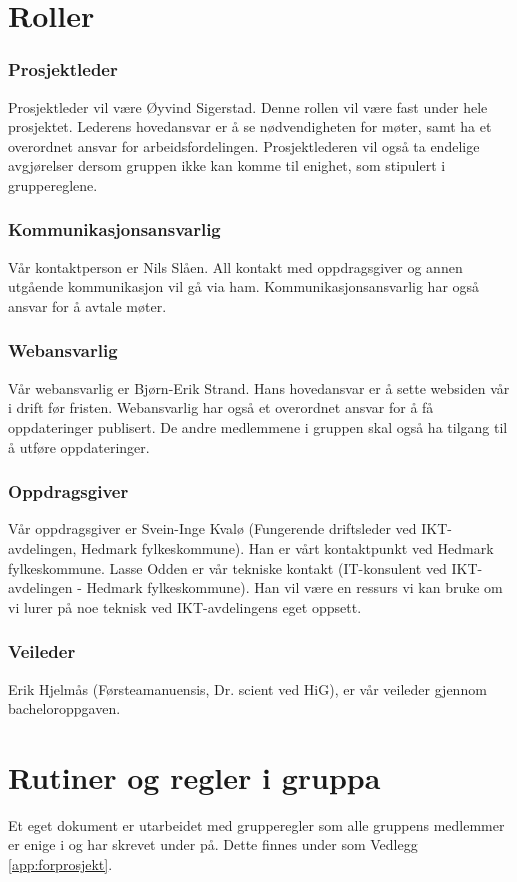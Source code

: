 \section{Roller}
\subsubsection{Prosjektleder}
Prosjektleder vil være Øyvind Sigerstad. Denne rollen vil være fast under hele prosjektet. Lederens hovedansvar er å se nødvendigheten for møter, samt ha et overordnet ansvar for arbeidsfordelingen. Prosjektlederen vil også ta endelige avgjørelser dersom gruppen ikke kan komme til enighet, som stipulert i gruppereglene.

\subsubsection{Kommunikasjonsansvarlig}
Vår kontaktperson er Nils Slåen. All kontakt med oppdragsgiver og annen utgående kommunikasjon vil gå via ham. Kommunikasjonsansvarlig har også ansvar for å avtale møter.

\subsubsection{Webansvarlig}
Vår webansvarlig er Bjørn-Erik Strand. Hans hovedansvar er å sette websiden vår i drift før fristen. Webansvarlig har også et overordnet ansvar for å få oppdateringer publisert. De andre medlemmene i gruppen skal også ha tilgang til å utføre oppdateringer.

\subsubsection{Oppdragsgiver}
Vår oppdragsgiver er Svein-Inge Kvalø (Fungerende driftsleder ved IKT-avdelingen, Hedmark fylkeskommune). Han er vårt kontaktpunkt ved Hedmark fylkeskommune. Lasse Odden er vår tekniske kontakt (IT-konsulent ved IKT-avdelingen - Hedmark fylkeskommune). Han vil være en ressurs vi kan bruke om vi lurer på noe teknisk ved IKT-avdelingens eget oppsett.

\subsubsection{Veileder}
Erik Hjelmås (Førsteamanuensis, Dr. scient ved HiG), er vår veileder gjennom bacheloroppgaven.

\section{Rutiner og regler i gruppa}
Et eget dokument er utarbeidet med grupperegler som alle gruppens medlemmer er enige i og har skrevet under på. Dette finnes under som Vedlegg \ref{app:forprosjekt}.

